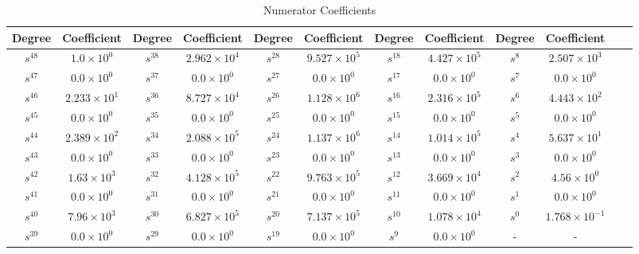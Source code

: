 \documentclass{article}
\begin{document}
\begin{table}[H]
  \centering
		\begin{adjustwidth}{-2.5cm}{}
		\caption{Numerator Coefficients}
		\begin{tabular}{|c|c|c|c|c|c|c|c|c|c|c|c|}
\hline
Degree & Coefficient & Degree & Coefficient & Degree & Coefficient & Degree & Coefficient & Degree & Coefficient\\
\hline
$s^{ 48 }$ & $ 1.0 \times 10^{ 0 }$ & $s^{ 38 }$ & $ 2.962 \times 10^{ 4 }$ & $s^{ 28 }$ & $ 9.527 \times 10^{ 5 }$  & $s^{ 18 }$ & $ 4.427 \times 10^{ 5 }$ & $s^{ 8 }$ & $ 2.507 \times 10^{ 3 }$ \\
\hline
$s^{ 47 }$ & $ 0.0 \times 10^{ 0 }$ & $s^{ 37 }$ & $ 0.0 \times 10^{ 0 }$ & $s^{ 27 }$ & $ 0.0 \times 10^{ 0 }$  & $s^{ 17 }$ & $ 0.0 \times 10^{ 0 }$ & $s^{ 7 }$ & $ 0.0 \times 10^{ 0 }$ \\
\hline
$s^{ 46 }$ & $ 2.233 \times 10^{ 1 }$ & $s^{ 36 }$ & $ 8.727 \times 10^{ 4 }$ & $s^{ 26 }$ & $ 1.128 \times 10^{ 6 }$  & $s^{ 16 }$ & $ 2.316 \times 10^{ 5 }$ & $s^{ 6 }$ & $ 4.443 \times 10^{ 2 }$ \\
\hline
$s^{ 45 }$ & $ 0.0 \times 10^{ 0 }$ & $s^{ 35 }$ & $ 0.0 \times 10^{ 0 }$ & $s^{ 25 }$ & $ 0.0 \times 10^{ 0 }$  & $s^{ 15 }$ & $ 0.0 \times 10^{ 0 }$ & $s^{ 5 }$ & $ 0.0 \times 10^{ 0 }$ \\
\hline
$s^{ 44 }$ & $ 2.389 \times 10^{ 2 }$ & $s^{ 34 }$ & $ 2.088 \times 10^{ 5 }$ & $s^{ 24 }$ & $ 1.137 \times 10^{ 6 }$  & $s^{ 14 }$ & $ 1.014 \times 10^{ 5 }$ & $s^{ 4 }$ & $ 5.637 \times 10^{ 1 }$ \\
\hline
$s^{ 43 }$ & $ 0.0 \times 10^{ 0 }$ & $s^{ 33 }$ & $ 0.0 \times 10^{ 0 }$ & $s^{ 23 }$ & $ 0.0 \times 10^{ 0 }$  & $s^{ 13 }$ & $ 0.0 \times 10^{ 0 }$ & $s^{ 3 }$ & $ 0.0 \times 10^{ 0 }$ \\
\hline
$s^{ 42 }$ & $ 1.63 \times 10^{ 3 }$ & $s^{ 32 }$ & $ 4.128 \times 10^{ 5 }$ & $s^{ 22 }$ & $ 9.763 \times 10^{ 5 }$  & $s^{ 12 }$ & $ 3.669 \times 10^{ 4 }$ & $s^{ 2 }$ & $ 4.56 \times 10^{ 0 }$ \\
\hline
$s^{ 41 }$ & $ 0.0 \times 10^{ 0 }$ & $s^{ 31 }$ & $ 0.0 \times 10^{ 0 }$ & $s^{ 21 }$ & $ 0.0 \times 10^{ 0 }$  & $s^{ 11 }$ & $ 0.0 \times 10^{ 0 }$ & $s^{ 1 }$ & $ 0.0 \times 10^{ 0 }$ \\
\hline
$s^{ 40 }$ & $ 7.96 \times 10^{ 3 }$ & $s^{ 30 }$ & $ 6.827 \times 10^{ 5 }$ & $s^{ 20 }$ & $ 7.137 \times 10^{ 5 }$  & $s^{ 10 }$ & $ 1.078 \times 10^{ 4 }$ & $s^{ 0 }$ & $ 1.768 \times 10^{ -1 }$ \\
\hline
$s^{ 39 }$ & $ 0.0 \times 10^{ 0 }$ & $s^{ 29 }$ & $ 0.0 \times 10^{ 0 }$ & $s^{ 19 }$ & $ 0.0 \times 10^{ 0 }$  & $s^{ 9 }$ & $ 0.0 \times 10^{ 0 }$ & - &-  \\
\hline
  	\end{tabular}
	\end{adjustwidth}
\end{table}
\end{document}
